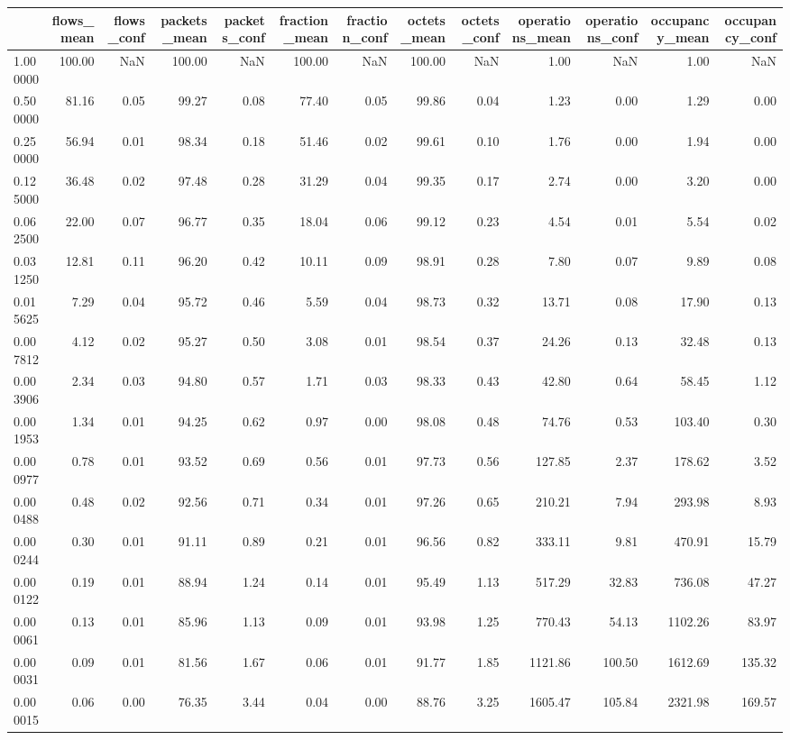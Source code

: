 \begin{tabular}{lrrrrrrrrrrrr}
\toprule
 & flows_mean & flows_conf & packets_mean & packets_conf & fraction_mean & fraction_conf & octets_mean & octets_conf & operations_mean & operations_conf & occupancy_mean & occupancy_conf \\
\midrule
1.000000 & 100.00 & NaN & 100.00 & NaN & 100.00 & NaN & 100.00 & NaN & 1.00 & NaN & 1.00 & NaN \\
0.500000 & 81.16 & 0.05 & 99.27 & 0.08 & 77.40 & 0.05 & 99.86 & 0.04 & 1.23 & 0.00 & 1.29 & 0.00 \\
0.250000 & 56.94 & 0.01 & 98.34 & 0.18 & 51.46 & 0.02 & 99.61 & 0.10 & 1.76 & 0.00 & 1.94 & 0.00 \\
0.125000 & 36.48 & 0.02 & 97.48 & 0.28 & 31.29 & 0.04 & 99.35 & 0.17 & 2.74 & 0.00 & 3.20 & 0.00 \\
0.062500 & 22.00 & 0.07 & 96.77 & 0.35 & 18.04 & 0.06 & 99.12 & 0.23 & 4.54 & 0.01 & 5.54 & 0.02 \\
0.031250 & 12.81 & 0.11 & 96.20 & 0.42 & 10.11 & 0.09 & 98.91 & 0.28 & 7.80 & 0.07 & 9.89 & 0.08 \\
0.015625 & 7.29 & 0.04 & 95.72 & 0.46 & 5.59 & 0.04 & 98.73 & 0.32 & 13.71 & 0.08 & 17.90 & 0.13 \\
0.007812 & 4.12 & 0.02 & 95.27 & 0.50 & 3.08 & 0.01 & 98.54 & 0.37 & 24.26 & 0.13 & 32.48 & 0.13 \\
0.003906 & 2.34 & 0.03 & 94.80 & 0.57 & 1.71 & 0.03 & 98.33 & 0.43 & 42.80 & 0.64 & 58.45 & 1.12 \\
0.001953 & 1.34 & 0.01 & 94.25 & 0.62 & 0.97 & 0.00 & 98.08 & 0.48 & 74.76 & 0.53 & 103.40 & 0.30 \\
0.000977 & 0.78 & 0.01 & 93.52 & 0.69 & 0.56 & 0.01 & 97.73 & 0.56 & 127.85 & 2.37 & 178.62 & 3.52 \\
0.000488 & 0.48 & 0.02 & 92.56 & 0.71 & 0.34 & 0.01 & 97.26 & 0.65 & 210.21 & 7.94 & 293.98 & 8.93 \\
0.000244 & 0.30 & 0.01 & 91.11 & 0.89 & 0.21 & 0.01 & 96.56 & 0.82 & 333.11 & 9.81 & 470.91 & 15.79 \\
0.000122 & 0.19 & 0.01 & 88.94 & 1.24 & 0.14 & 0.01 & 95.49 & 1.13 & 517.29 & 32.83 & 736.08 & 47.27 \\
0.000061 & 0.13 & 0.01 & 85.96 & 1.13 & 0.09 & 0.01 & 93.98 & 1.25 & 770.43 & 54.13 & 1102.26 & 83.97 \\
0.000031 & 0.09 & 0.01 & 81.56 & 1.67 & 0.06 & 0.01 & 91.77 & 1.85 & 1121.86 & 100.50 & 1612.69 & 135.32 \\
0.000015 & 0.06 & 0.00 & 76.35 & 3.44 & 0.04 & 0.00 & 88.76 & 3.25 & 1605.47 & 105.84 & 2321.98 & 169.57 \\

\end{tabular}
